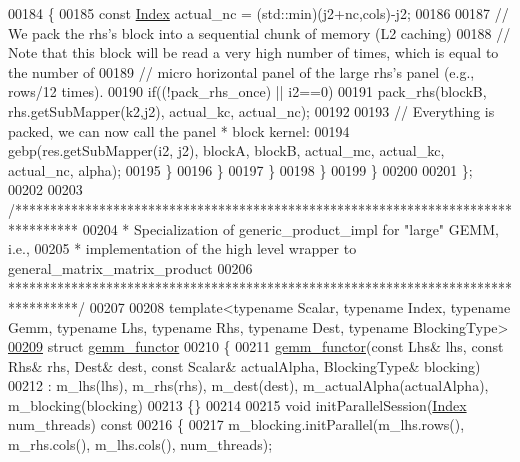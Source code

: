 \begin{DoxyCode}
00184         \{
00185           \textcolor{keyword}{const} \hyperlink{namespace_eigen_a62e77e0933482dafde8fe197d9a2cfde}{Index} actual\_nc = (std::min)(j2+nc,cols)-j2;
00186 
00187           \textcolor{comment}{// We pack the rhs's block into a sequential chunk of memory (L2 caching)}
00188           \textcolor{comment}{// Note that this block will be read a very high number of times, which is equal to the number of}
00189           \textcolor{comment}{// micro horizontal panel of the large rhs's panel (e.g., rows/12 times).}
00190           \textcolor{keywordflow}{if}((!pack\_rhs\_once) || i2==0)
00191             pack\_rhs(blockB, rhs.getSubMapper(k2,j2), actual\_kc, actual\_nc);
00192 
00193           \textcolor{comment}{// Everything is packed, we can now call the panel * block kernel:}
00194           gebp(res.getSubMapper(i2, j2), blockA, blockB, actual\_mc, actual\_kc, actual\_nc, alpha);
00195         \}
00196       \}
00197     \}
00198   \}
00199 \}
00200 
00201 \};
00202 
00203 \textcolor{comment}{/*********************************************************************************}
00204 \textcolor{comment}{*  Specialization of generic\_product\_impl for "large" GEMM, i.e.,}
00205 \textcolor{comment}{*  implementation of the high level wrapper to general\_matrix\_matrix\_product}
00206 \textcolor{comment}{**********************************************************************************/}
00207 
00208 \textcolor{keyword}{template}<\textcolor{keyword}{typename} Scalar, \textcolor{keyword}{typename} Index, \textcolor{keyword}{typename} Gemm, \textcolor{keyword}{typename} Lhs, \textcolor{keyword}{typename} Rhs, \textcolor{keyword}{typename} Dest, \textcolor{keyword}{
      typename} BlockingType>
\hyperlink{struct_eigen_1_1internal_1_1gemm__functor}{00209} \textcolor{keyword}{struct }\hyperlink{struct_eigen_1_1internal_1_1gemm__functor}{gemm\_functor}
00210 \{
00211   \hyperlink{struct_eigen_1_1internal_1_1gemm__functor}{gemm\_functor}(\textcolor{keyword}{const} Lhs& lhs, \textcolor{keyword}{const} Rhs& rhs, Dest& dest, \textcolor{keyword}{const} Scalar& actualAlpha, 
      BlockingType& blocking)
00212     : m\_lhs(lhs), m\_rhs(rhs), m\_dest(dest), m\_actualAlpha(actualAlpha), m\_blocking(blocking)
00213   \{\}
00214 
00215   \textcolor{keywordtype}{void} initParallelSession(\hyperlink{namespace_eigen_a62e77e0933482dafde8fe197d9a2cfde}{Index} num\_threads)\textcolor{keyword}{ const}
00216 \textcolor{keyword}{  }\{
00217     m\_blocking.initParallel(m\_lhs.rows(), m\_rhs.cols(), m\_lhs.cols(), num\_threads);

\end{DoxyCode}
